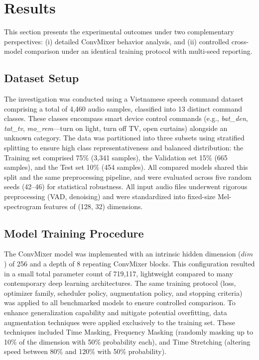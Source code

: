 \section*{Results}

This section presents the experimental outcomes under two complementary perspectives: (i) detailed ConvMixer behavior analysis, and (ii) controlled cross-model comparison under an identical training protocol with multi-seed reporting.

\subsection*{Dataset Setup}

The investigation was conducted using a Vietnamese speech command dataset comprising a total of 4,460 audio samples, classified into 13 distinct command classes. These classes encompass smart device control commands (e.g., \textit{bat\_den}, \textit{tat\_tv}, \textit{mo\_rem}—turn on light, turn off TV, open curtains) alongside an unknown category. The data was partitioned into three subsets using stratified splitting to ensure high class representativeness and balanced distribution: the Training set comprised 75\% (3,341 samples), the Validation set 15\% (665 samples), and the Test set 10\% (454 samples). All compared models shared this split and the same preprocessing pipeline, and were evaluated across five random seeds (42--46) for statistical robustness. All input audio files underwent rigorous preprocessing (VAD, denoising) and were standardized into fixed-size Mel-spectrogram features of (128, 32) dimensions.

\subsection*{Model Training Procedure}

The ConvMixer model was implemented with an intrinsic hidden dimension ($dim$) of 256 and a depth of 8 repeating ConvMixer blocks. This configuration resulted in a small total parameter count of 719,117, lightweight compared to many contemporary deep learning architectures. The same training protocol (loss, optimizer family, scheduler policy, augmentation policy, and stopping criteria) was applied to all benchmarked models to ensure controlled comparison. To enhance generalization capability and mitigate potential overfitting, data augmentation techniques were applied exclusively to the training set. These techniques included Time Masking, Frequency Masking (randomly masking up to 10\% of the dimension with 50\% probability each), and Time Stretching (altering speed between 80\% and 120\% with 50\% probability).


